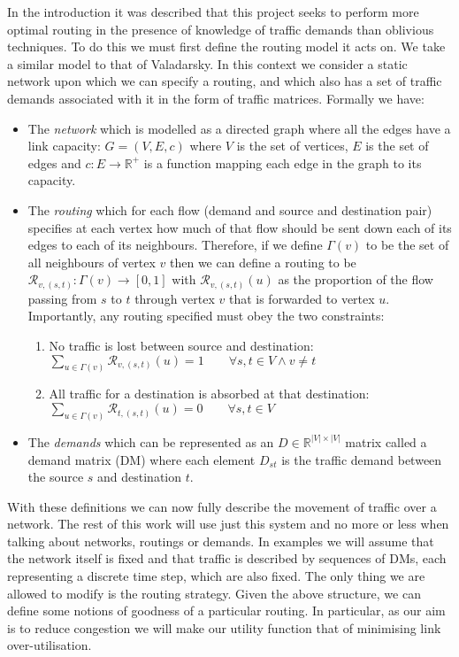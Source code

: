 In the introduction it was described that this project seeks to perform more optimal routing in the presence of knowledge of traffic demands than oblivious techniques. To do this we must first define the routing model it acts on. We take a similar model to that of Valadarsky\cite{valadarsky2017learning}. In this context we consider a static network upon which we can specify a routing, and which also has a set of traffic demands associated with it in the form of traffic matrices. Formally we have:
\begin{itemize}
  \item The \emph{network} which is modelled as a directed graph where all the edges have a link capacity: $G=(V,E,c)$ where $V$ is the set of vertices, $E$ is the set of edges and $c : E \rightarrow \mathbb{R}^+$ is a function mapping each edge in the graph to its capacity.
  \item The \emph{routing} which for each flow (demand and source and destination pair) specifies at each vertex how much of that flow should be sent down each of its edges to each of its neighbours. Therefore, if we define $\Gamma(v)$ to be the set of all neighbours of vertex $v$ then we can define a routing to be $\mathcal{R}_{v,(s,t)} : \Gamma(v) \rightarrow [0,1]$ with $\mathcal{R}_{v,(s,t)}(u)$ as the proportion of the flow passing from $s$ to $t$ through vertex $v$ that is forwarded to vertex $u$. Importantly, any routing specified must obey the two constraints:
    \begin{enumerate}
      \item No traffic is lost between source and destination:\\
        $\sum_{u \in \Gamma(v)}{\mathcal{R}_{v,(s,t)}(u)} = 1 \qquad \forall s, t \in V \wedge v \neq t$
      \item All traffic for a destination is absorbed at that destination:\\
        $\sum_{u \in \Gamma(v)}{\mathcal{R}_{t,(s,t)}(u)} = 0 \qquad \forall s, t \in V$
    \end{enumerate}
  \item The \emph{demands} which can be represented as an $D \in \mathbb{R}^{|V|\times|V|}$ matrix called a demand matrix (DM) where each element $D_{st}$ is the traffic demand between the source $s$ and destination $t$.
\end{itemize}

With these definitions we can now fully describe the movement of traffic over a network. The rest of this work will use just this system and no more or less when talking about networks, routings or demands. In examples we will assume that the network itself is fixed and that traffic is described by sequences of DMs, each representing a discrete time step, which are also fixed. The only thing we are allowed to modify is the routing strategy. Given the above structure, we can define some notions of goodness of a particular routing. In particular, as our aim is to reduce congestion we will make our utility function that of minimising link over-utilisation.

